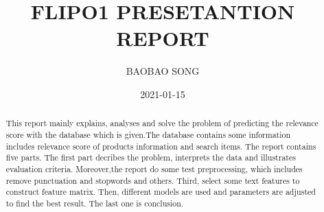 \documentclass{amsart}
\begin{document}
%
%
\title[Flip01 report]{FLIPO1 PRESETANTION REPORT}%

\author{BAOBAO SONG}

\date{2021-01-15}%

\begin{abstract}
This report mainly explains, analyses and solve the problem of predicting the relevance score with the database which is given.The database contains some information includes relevance score of products information and search items. The report contains ﬁve parts. The first part decribes the  problem, interprets the data and illustrates evaluation criteria. Moreover,the report do some test preprocessing, which includes remove punctuation and stopwords and others. Third, select some text features to construct feature matrix. Then, different models are used and parameters are adjusted to find the best result. The last one is conclusion.

\end{abstract}

\maketitle
\tableofcontents

\newpage



\newpage

\end{document}

